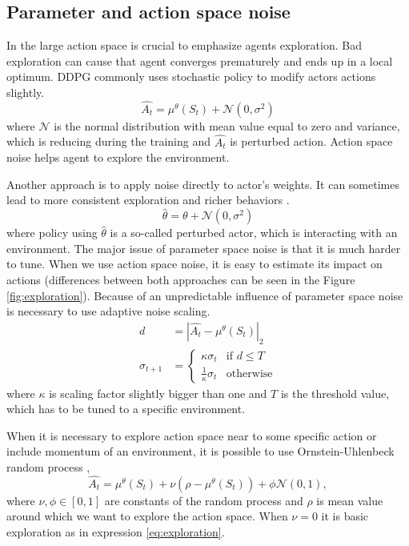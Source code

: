\subsection{Parameter and action space noise}
\label{sec:exploration}
In the large action space is crucial to emphasize agents exploration. Bad exploration can cause that agent converges prematurely and ends up in a local optimum. DDPG commonly uses stochastic policy to modify actors actions slightly.
\begin{equation} \label{eq:exploration}
\hat{A_t} = \mu^\theta(S_t) + \mathcal{N}(0, \sigma^2)
\end{equation}
where $\mathcal{N}$ is the normal distribution with mean value equal to zero and variance, which is reducing during the training and $\hat{A_t}$ is perturbed action. Action space noise helps agent to explore the environment. \par Another approach is to apply noise directly to actor's weights. It can sometimes lead to more consistent exploration and richer behaviors \cite{plappert2017}.
\begin{equation}
\hat{\theta} = \theta + \mathcal{N}(0, \sigma^2)
\end{equation}
where policy using $\hat{\theta}$ is a so-called perturbed actor, which is interacting with an environment. The major issue of parameter space noise is that it is much harder to tune. When we use action space noise, it is easy to estimate its impact on actions (differences between both approaches can be seen in the Figure \ref{fig:exploration}). Because of an unpredictable influence of parameter space noise is necessary to use adaptive noise scaling.
\begin{align}
d &= |\hat{A_t} - \mu^\theta(S_t)|_2  \\
\sigma_{t+1} &= 
     \begin{cases}
       \kappa \sigma_t & \text{if } d \leq T \\
       \frac{1}{\kappa}\sigma_t & \text{otherwise}
     \end{cases}
\end{align}
where $\kappa$ is scaling factor slightly bigger than one and $T$ is the threshold value, which has to be tuned to a specific environment.
\par When it is necessary to explore action space near to some specific action or include momentum of an environment, it is possible to use Ornstein-Uhlenbeck random process \citep{lilicrap2015}, 
\begin{equation}
\hat{A_t} = \mu^\theta(S_t)  + \nu (\rho - \mu^\theta(S_t)) + \phi \mathcal{N}(0, 1),
\end{equation}
where $\nu, \phi \in [0, 1]$ are constants of the random process and $\rho$ is mean value around which we want to explore the action space. When $\nu = 0$ it is basic exploration as in expression \eqref{eq:exploration}.

